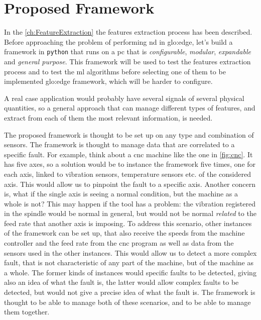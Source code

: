 \chapter{Proposed Framework}
\label{ch:Framework}

In the \autoref{ch:FeatureExtraction} the features extraction process has been described. Before approaching the problem of performing \gls{nd} in \gls{glo:edge}, let's build a framework in \texttt{python} that runs on a \gls{pc} that is \emph{configurable}, \emph{modular}, \emph{expandable} and \emph{general purpose}. This framework will be used to test the features extraction process and to test the \gls{ml} algorithms before selecting one of them to be implemented \gls{glo:edge} framework, which will be harder to configure.

A real case application would probably have several signals of several physical quantities, so a general approach that can manage different types of features, and extract from each of them the most relevant information, is needed.

The proposed framework is thought to be set up on any type and combination of sensors. The framework is thought to manage data that are correlated to a specific fault. For example, think about a \gls{cnc} machine like the one in \autoref{fig:cnc}. It has five axes, so a solution would be to instance the framework five times, one for each axis, linked to vibration sensors, temperature sensors etc. of the considered axis. This would allow us to pinpoint the fault to a specific axis. Another concern is, what if the single axis is seeing a normal condition, but the machine as a whole is not? This may happen if the tool has a problem: the vibration registered in the spindle would be normal in general, but would not be normal \emph{related} to the feed rate that another axis is imposing. To address this scenario, other instances of the framework can be set up, that also receive the speeds from the machine controller and the feed rate from the \gls{cnc} program as well as data from the sensors used in the other instances. This would allow us to detect a more complex fault, that is not characteristic of any part of the machine, but of the machine as a whole. The former kinds of instances would specific faults to be detected, giving also an idea of what the fault is, the latter would allow complex faults to be detected, but would not give a precise idea of what the fault is. The framework is thought to be able to manage both of these scenarios, and to be able to manage them together.

